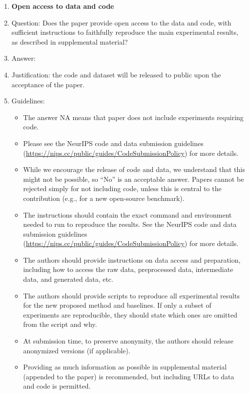 \documentclass{article}
\begin{document}
\begin{enumerate}
\item {\bf Open access to data and code}
    \item[] Question: Does the paper provide open access to the data and code, with sufficient instructions to faithfully reproduce the main experimental results, as described in supplemental material?
    \item[] Answer: \answerNo{} %
    \item[] Justification: the code and dataset will be released to public upon the acceptance of the paper.
    \item[] Guidelines:
    \begin{itemize}
        \item The answer NA means that paper does not include experiments requiring code.
        \item Please see the NeurIPS code and data submission guidelines (\url{https://nips.cc/public/guides/CodeSubmissionPolicy}) for more details.
        \item While we encourage the release of code and data, we understand that this might not be possible, so “No” is an acceptable answer. Papers cannot be rejected simply for not including code, unless this is central to the contribution (e.g., for a new open-source benchmark).
        \item The instructions should contain the exact command and environment needed to run to reproduce the results. See the NeurIPS code and data submission guidelines (\url{https://nips.cc/public/guides/CodeSubmissionPolicy}) for more details.
        \item The authors should provide instructions on data access and preparation, including how to access the raw data, preprocessed data, intermediate data, and generated data, etc.
        \item The authors should provide scripts to reproduce all experimental results for the new proposed method and baselines. If only a subset of experiments are reproducible, they should state which ones are omitted from the script and why.
        \item At submission time, to preserve anonymity, the authors should release anonymized versions (if applicable).
        \item Providing as much information as possible in supplemental material (appended to the paper) is recommended, but including URLs to data and code is permitted.
    \end{itemize}



\end{enumerate}
\end{document}
